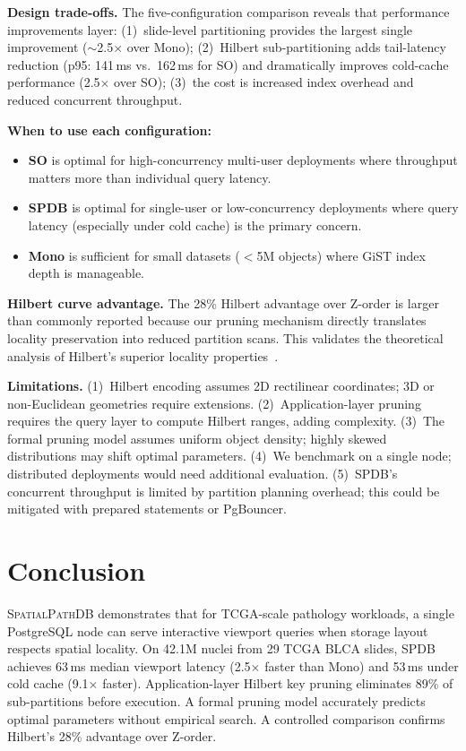 \documentclass[10pt,twocolumn]{article}
\begin{document}
\textbf{Design trade-offs.}
The five-configuration comparison reveals that performance improvements layer:
(1)~slide-level partitioning provides the largest single improvement ($\sim$2.5$\times$ over Mono);
(2)~Hilbert sub-partitioning adds tail-latency reduction (p95: 141\,ms vs.\ 162\,ms for SO) and dramatically improves cold-cache performance (2.5$\times$ over SO);
(3)~the cost is increased index overhead and reduced concurrent throughput.

\textbf{When to use each configuration:}
\begin{itemize}
\item \textbf{SO} is optimal for high-concurrency multi-user deployments where throughput matters more than individual query latency.
\item \textbf{SPDB} is optimal for single-user or low-concurrency deployments where query latency (especially under cold cache) is the primary concern.
\item \textbf{Mono} is sufficient for small datasets ($<$5M objects) where GiST index depth is manageable.
\end{itemize}

\textbf{Hilbert curve advantage.}
The 28\% Hilbert advantage over Z-order is larger than commonly reported because our pruning mechanism directly translates locality preservation into reduced partition scans.
This validates the theoretical analysis of Hilbert's superior locality properties~\cite{moon2001analysis}.

\textbf{Limitations.}
(1)~Hilbert encoding assumes 2D rectilinear coordinates; 3D or non-Euclidean geometries require extensions.
(2)~Application-layer pruning requires the query layer to compute Hilbert ranges, adding complexity.
(3)~The formal pruning model assumes uniform object density; highly skewed distributions may shift optimal parameters.
(4)~We benchmark on a single node; distributed deployments would need additional evaluation.
(5)~SPDB's concurrent throughput is limited by partition planning overhead; this could be mitigated with prepared statements or PgBouncer.

\section{Conclusion}
\label{sec:conclusion}

\textsc{SpatialPathDB} demonstrates that for TCGA-scale pathology workloads, a single PostgreSQL node can serve interactive viewport queries when storage layout respects spatial locality.
On 42.1M nuclei from 29 TCGA BLCA slides, SPDB achieves 63\,ms median viewport latency (2.5$\times$ faster than Mono) and 53\,ms under cold cache (9.1$\times$ faster).
Application-layer Hilbert key pruning eliminates 89\% of sub-partitions before execution.
A formal pruning model accurately predicts optimal parameters without empirical search.
A controlled comparison confirms Hilbert's 28\% advantage over Z-order.
\end{document}
